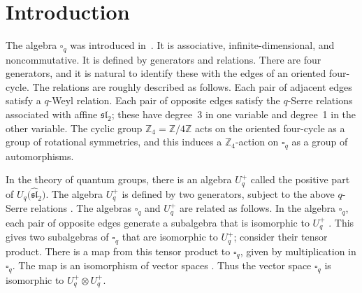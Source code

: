 \documentclass[pdftex]{sigma}
\numberwithin{equation}{section}
\begin{document}


\section{Introduction}\label{section1}

The algebra $\square_q$ was introduced in~\cite{pospart}. It is associative, infinite-dimensional, and noncommutative. It is defined by generators and relations. There are four generators, and it is natural to identify these with the edges of an oriented four-cycle. The relations are roughly described as follows.
Each pair of adjacent edges satisfy a $q$-Weyl relation. Each pair of opposite edges satisfy the $q$-Serre relations associated with affine $\mathfrak{sl}_2$; these have degree~3 in one variable and degree~1 in the other variable. The cyclic group $\mathbb Z_4 =\mathbb Z/4 \mathbb Z$ acts on the oriented four-cycle as a group of rotational symmetries, and this induces a ${\mathbb Z}_4$-action on $\square_q$ as a group of
automorphisms.

In the theory of quantum groups, there is an algebra
$U^+_q$ called the positive part of $U_q\big(\widehat {\mathfrak {sl}}_2\big)$.
The algebra $U^+_q$ is defined by two generators, subject to
the above $q$-Serre relations
\cite[Corollary~3.2.6]{lusztig}.
The algebras $\square_q$ and $U^+_q$ are related as follows.
In the algebra $\square_q$,
each pair of opposite edges generate a subalgebra
that is isomorphic to
$U^+_q$
\cite[Proposition~5.5]{pospart}.
 This gives two subalgebras of $\square_q$ that are
isomorphic to $U^+_q$; consider their tensor product.
There is a map from this tensor product to $\square_q$,
given by multiplication in $\square_q$.
The map is an isomorphism of vector spaces
\cite[Proposition~5.5]{pospart}. Thus the
vector space $\square_q$ is isomorphic to
$U^+_q \otimes U^+_q$.
\end{document}
